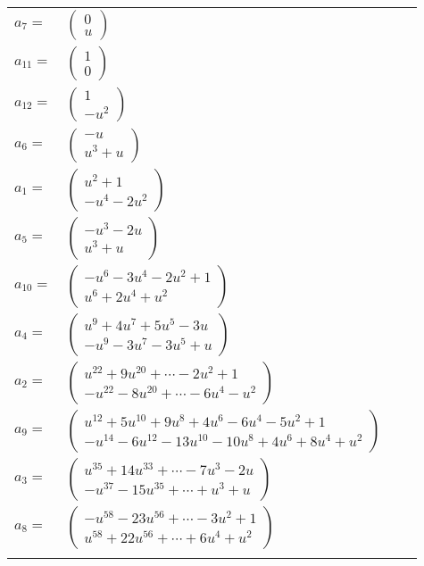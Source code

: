 \documentclass[1p]{elsarticle_modified}
\theoremstyle{definition}
\begin{document}
\begin{tabular}{m{7pt} m{180pt} m{7pt} m{180pt} }
\flushright $a_{7}=$&$\begin{pmatrix}0\\u\end{pmatrix}$ \\
\flushright $a_{11}=$&$\begin{pmatrix}1\\0\end{pmatrix}$ \\
\flushright $a_{12}=$&$\begin{pmatrix}1\\- u^2\end{pmatrix}$ \\
\flushright $a_{6}=$&$\begin{pmatrix}- u\\u^3+u\end{pmatrix}$ \\
\flushright $a_{1}=$&$\begin{pmatrix}u^2+1\\- u^4-2 u^2\end{pmatrix}$ \\
\flushright $a_{5}=$&$\begin{pmatrix}- u^3-2 u\\u^3+u\end{pmatrix}$ \\
\flushright $a_{10}=$&$\begin{pmatrix}- u^6-3 u^4-2 u^2+1\\u^6+2 u^4+u^2\end{pmatrix}$ \\
\flushright $a_{4}=$&$\begin{pmatrix}u^9+4 u^7+5 u^5-3 u\\- u^9-3 u^7-3 u^5+u\end{pmatrix}$ \\
\flushright $a_{2}=$&$\begin{pmatrix}u^{22}+9 u^{20}+\cdots-2 u^2+1\\- u^{22}-8 u^{20}+\cdots-6 u^4- u^2\end{pmatrix}$ \\
\flushright $a_{9}=$&$\begin{pmatrix}u^{12}+5 u^{10}+9 u^8+4 u^6-6 u^4-5 u^2+1\\- u^{14}-6 u^{12}-13 u^{10}-10 u^8+4 u^6+8 u^4+u^2\end{pmatrix}$ \\
\flushright $a_{3}=$&$\begin{pmatrix}u^{35}+14 u^{33}+\cdots-7 u^3-2 u\\- u^{37}-15 u^{35}+\cdots+u^3+u\end{pmatrix}$ \\
\flushright $a_{8}=$&$\begin{pmatrix}- u^{58}-23 u^{56}+\cdots-3 u^2+1\\u^{58}+22 u^{56}+\cdots+6 u^4+u^2\end{pmatrix}$\\&\end{tabular}
\end{document}
